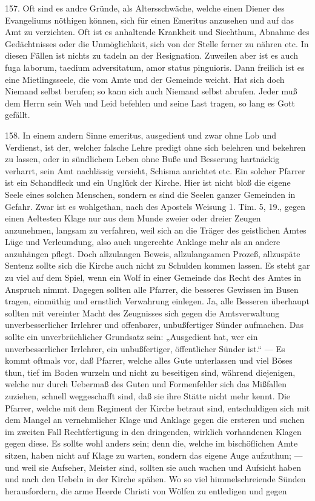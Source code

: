 157. Oft sind es andre Gründe, als Altersschwäche, welche einen Diener des Evangeliums nöthigen können, sich für einen Emeritus anzusehen und auf das Amt zu verzichten. Oft ist es anhaltende Krankheit und Siechthum, Abnahme des Gedächtnisses oder die Unmöglichkeit, sich von der Stelle ferner zu nähren etc. In diesen Fällen ist nichts zu tadeln an der Resignation. Zuweilen aber ist es auch fuga laborum, taedium adversitatum, amor status pinguioris. Dann freilich ist es eine Mietlingsseele, die vom Amte und der Gemeinde weicht. Hat sich doch Niemand selbst berufen; so kann sich auch Niemand selbst abrufen. Jeder muß dem Herrn sein Weh und Leid befehlen und seine Last tragen, so lang es Gott gefällt.

158. In einem andern Sinne emeritus, ausgedient und zwar ohne Lob und Verdienst, ist der, welcher falsche Lehre predigt ohne sich belehren und bekehren zu lassen, oder in sündlichem Leben ohne Buße und Besserung hartnäckig verharrt, sein Amt nachlässig versieht, Schisma anrichtet etc. Ein solcher Pfarrer ist ein Schandfleck und ein Unglück der Kirche. Hier ist nicht bloß die eigene Seele eines solchen Menschen, sondern es sind die Seelen ganzer Gemeinden in Gefahr. Zwar ist es wohlgethan, nach des Apostels Weisung 1. Tim. 5, 19., gegen einen Aeltesten Klage nur aus dem Munde zweier oder dreier Zeugen anzunehmen, langsam zu verfahren, weil sich an die Träger des geistlichen Amtes Lüge und Verleumdung, also auch ungerechte Anklage mehr als an andere anzuhängen pflegt.
Doch allzulangen Beweis, allzulangsamen Prozeß, allzuspäte Sentenz sollte sich die Kirche auch nicht zu Schulden kommen lassen. Es steht gar zu viel auf dem Spiel, wenn ein Wolf in einer Gemeinde das Recht des Amtes in Anspruch nimmt. Dagegen sollten alle Pfarrer, die besseres Gewissen im Busen tragen, einmüthig und ernstlich Verwahrung einlegen. Ja, alle Besseren überhaupt sollten mit vereinter Macht des Zeugnisses sich gegen die Amtsverwaltung unverbesserlicher Irrlehrer und offenbarer, unbußfertiger Sünder aufmachen. Das sollte ein unverbrüchlicher Grundsatz sein: „Ausgedient hat, wer ein unverbesserlicher Irrlehrer, ein unbußfertiger, öffentlicher Sünder ist.“ — Es kommt oftmals vor, daß Pfarrer, welche alles Gute unterlassen und viel Böses thun, tief im Boden wurzeln und nicht zu beseitigen sind, während diejenigen, welche nur durch Uebermaß des Guten und Formenfehler sich das Mißfallen zuziehen, schnell weggeschafft sind, daß sie ihre Stätte nicht mehr kennt. Die Pfarrer, welche mit dem Regiment der Kirche betraut sind, entschuldigen sich mit dem Mangel an vernehmlicher Klage und Anklage gegen die ersteren und suchen im zweiten Fall Rechtfertigung in den dringenden, wirklich vorhandenen Klagen gegen diese. Es sollte wohl anders sein; denn die, welche im bischöflichen Amte sitzen, haben nicht auf Klage zu warten, sondern das eigene Auge aufzuthun; — und weil sie Aufseher, Meister sind, sollten sie auch wachen und Aufsicht haben und nach den Uebeln in der Kirche spähen. Wo so viel himmelschreiende Sünden herausfordern, die arme Heerde Christi von Wölfen zu entledigen und gegen
